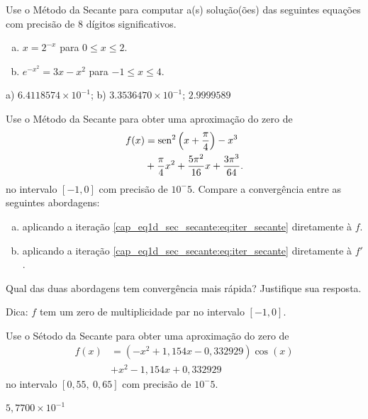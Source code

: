 \begin{exer}
  Use o Método da Secante para computar a(s) solução(ões) das seguintes equações com precisão de 8 dígitos significativos.
  \begin{enumerate}[a)]
  \item $x = 2^{-x}$ para $0\leq x \leq 2$.
  \item $e^{-x^2} = 3x - x^2$ para $-1\leq x\leq 4$.
  \end{enumerate}
\end{exer}
\begin{resp}
  a) $6.4118574\times 10^{-1}$; b) $3.3536470\times 10^{-1}$; $2.9999589$
\end{resp}

\begin{exer}
  Use o Método da Secante para obter uma aproximação do zero de
  \begin{equation}
    \begin{aligned}
      f(x) &= \operatorname{sen}^2\left(x+\frac{\pi}{4}\right) - x^3 \\
           &+ \frac{\pi}{4}x^2 + \frac{5\pi^2}{16}x + \frac{3\pi^3}{64}.
    \end{aligned}
\end{equation}
  no intervalo $[-1, 0]$ com precisão de $10^-5$. Compare a convergência entre as seguintes abordagens:
  \begin{enumerate}[a)]
  \item aplicando a iteração \eqref{cap_eq1d_sec_secante:eq:iter_secante} diretamente à $f$.
  \item aplicando a iteração \eqref{cap_eq1d_sec_secante:eq:iter_secante} diretamente à $f'$.
  \end{enumerate}
  Qual das duas abordagens tem convergência mais rápida? Justifique sua resposta.
\end{exer}
\begin{resp}
  Dica: $f$ tem um zero de multiplicidade par no intervalo $[-1, 0]$.
\end{resp}

\begin{exer}
  Use o Sétodo da Secante para obter uma aproximação do zero de
  \begin{equation}
    \begin{aligned}
      f(x) &= (-x^2+1,154x-0,332929)\cos(x) \\
           &+ x^2 - 1,154x + 0,332929
    \end{aligned}
\end{equation}
no intervalo $[0,55, ~0,65]$ com precisão de $10^-5$.
\end{exer}
\begin{resp}
  $5,7700\times 10^{-1}$
\end{resp}


